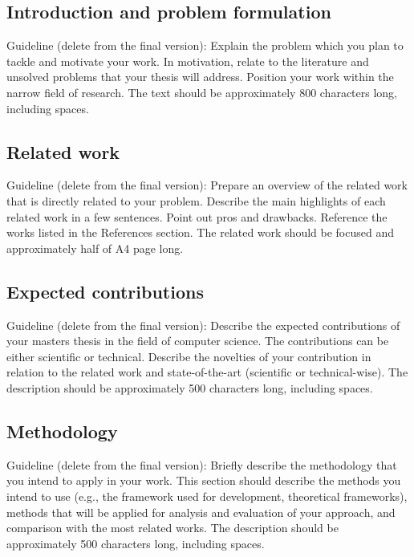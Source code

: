 \documentclass[a4paper, 12pt]{article}
\begin{document}
\subsection{Introduction and problem formulation}

Guideline (delete from the final version):
Explain the problem which you plan to tackle and motivate your work. In motivation, relate to the literature and unsolved problems that your thesis will address. Position your work within the narrow field of research. The text should be approximately 800 characters long, including spaces.


\subsection{Related work}

Guideline (delete from the final version):
Prepare an overview of the related work that is directly related to your problem. Describe the main highlights of each related work in a few sentences. Point out pros and drawbacks. Reference the works listed in the References section. The related work should be focused and approximately half of A4 page long.

\subsection{Expected contributions}

Guideline (delete from the final version):
Describe the expected contributions of your masters thesis in the field of computer science. The contributions can be either scientific or technical. Describe the novelties of your contribution in relation to the related work and state-of-the-art (scientific or technical-wise). The description should be approximately 500 characters long, including spaces.

\subsection{Methodology}

Guideline (delete from the final version):
Briefly describe the methodology that you intend to apply in your work. This section should describe the methods you intend to use (e.g., the framework used for development, theoretical frameworks), methods that will be applied for analysis and evaluation of your approach, and comparison with the most related works. The description should be approximately 500 characters long, including spaces.
\end{document}
